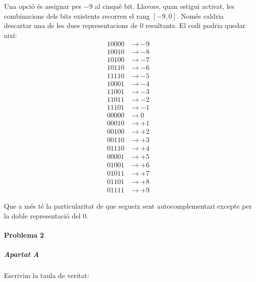 Una opció és assignar pes $-9$ al cinquè bit. Llavors, quan estigui activat, les combinacions
dels bits existents recorren el rang $\left[-9,0\right]$. Només caldria descartar una de
les dues representacions de $0$ resultants. El codi podria quedar així:
%
\begin{align*}
  10000 &\rightarrow -9 \\
  10010 &\rightarrow -8 \\
  10100 &\rightarrow -7 \\
  10110 &\rightarrow -6 \\
  11110 &\rightarrow -5 \\
  10001 &\rightarrow -4 \\
  11001 &\rightarrow -3 \\
  11011 &\rightarrow -2 \\
  11101 &\rightarrow -1 \\
  00000 &\rightarrow  0 \\
  00010 &\rightarrow +1 \\
  00100 &\rightarrow +2 \\
  00110 &\rightarrow +3 \\
  01110 &\rightarrow +4 \\
  00001 &\rightarrow +5 \\
  01001 &\rightarrow +6 \\
  01011 &\rightarrow +7 \\
  01101 &\rightarrow +8 \\
  01111 &\rightarrow +9
\end{align*}

Que a més té la particularitat de que segueix sent autocomplementari excepte per
la doble representació del 0.

\finishpage

\startpage
\paragraph{Problema 2}

\subparagraph{Apartat A}

Escrivim la taula de veritat:

